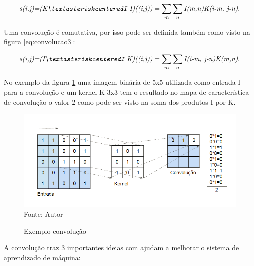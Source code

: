 \documentclass[
	12pt,				%
    oneside,			%
	a4paper,			%
	english,			%
	french,				%
	spanish,			%
	brazil,				%
	]{abntex2}
\begin{document}
\begin{equation}
\centering
    \textit{s(i,j)=(K\textasteriskcenteredI I)((i,j))} = \sum_{m} \sum_{n} \textit{I(m,n)K(i-m, j-n)} .
    \label{eq:convolucao2}
\end{equation}

Uma convolução é comutativa, por isso pode ser definida também como visto na figura \ref{eq:convolucao3}:

\begin{equation}
\centering
    \textit{s(i,j)=(I\textasteriskcenteredI K)((i,j))} = \sum_{m} \sum_{n} \textit{I(i-m, j-n)K(m,n)} .
    \label{eq:convolucao3}
\end{equation}


No exemplo da figura \ref{fig:convolução} uma imagem binária de 5x5 utilizada como entrada I para a convolução e um kernel K 3x3 tem o resultado no mapa de característica de convolução o valor 2 como pode ser visto na soma dos produtos I por K.

\begin{figure}[H]
    \centering
    \caption{Exemplo convolução}
    \includegraphics[scale=0.65]{convolucao1}\\
    Fonte: Autor\hfill
    \label{fig:convolução}
\end{figure}

A convolução traz 3 importantes ideias com ajudam a melhorar o sistema de aprendizado de máquina:
\end{document}
